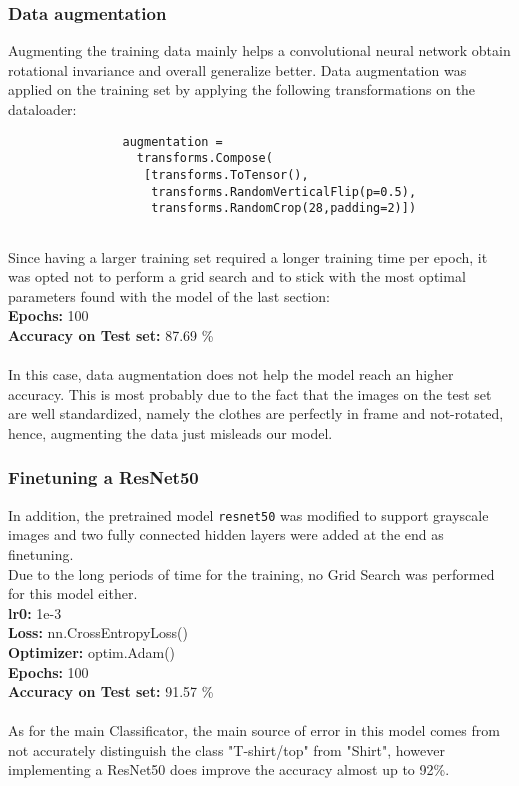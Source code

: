 \documentclass[11pt,a4paper,twocolumn]{IEEEtran}
\newcommand{\thinnersepline}{\noindent\makebox[\linewidth]{\rule{7.5cm}{0.01pt}}}
\begin{document}
			\subsubsection{Data augmentation}
			Augmenting the training data mainly helps a convolutional neural network obtain rotational invariance and  overall generalize better.
			Data augmentation was applied on the training set by applying the following transformations on the dataloader:\\
			\begin{verbatim}
				augmentation = 
				  transforms.Compose(
				   [transforms.ToTensor(),
				    transforms.RandomVerticalFlip(p=0.5),
				    transforms.RandomCrop(28,padding=2)])
				
			\end{verbatim}
			Since having a larger training set required a longer training time per epoch, it was opted not to perform a grid search and to stick with the most optimal parameters found with the model of the last section:
			\thinnersepline\\
			\textbf{Epochs:} 100\\
			\textbf{Accuracy on Test set:} 87.69 \%\vspace*{-.2cm}\\
			\thinnersepline\\
			In this case, data augmentation does not help the model reach an higher accuracy. This is most probably due to the fact that the images on the test set are well standardized, namely the clothes are perfectly in frame and not-rotated, hence, augmenting the data just misleads our model. \medskip\\
			\subsubsection{Finetuning a ResNet50}
			In addition, the pretrained model \texttt{resnet50} was modified to support grayscale images and two fully connected hidden layers were added at the end as finetuning.\\
			Due to the long periods of time for the training, no Grid Search was performed for this model either.
			\thinnersepline\\
			\textbf{lr0:} 1e-3\\
			\textbf{Loss:} nn.CrossEntropyLoss()\\
			\textbf{Optimizer:} optim.Adam() \\
			\textbf{Epochs:} 100 \\
			\textbf{Accuracy on Test set:} 91.57 \%\vspace*{-.2cm}\\
			\thinnersepline\\
			As for the main Classificator, the main source of error in this model comes from not accurately distinguish the class "T-shirt/top" from "Shirt", however implementing a ResNet50 does improve the accuracy almost up to 92\%.
	
\end{document}
